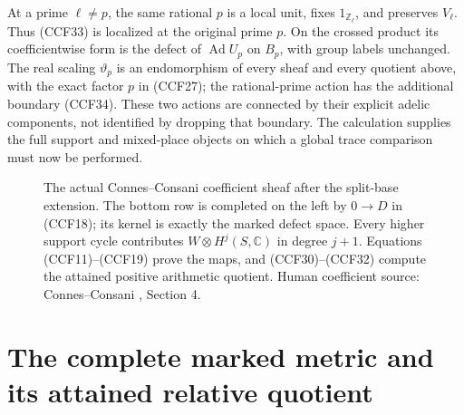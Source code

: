 \documentclass[11pt,a4paper]{article}
\theoremstyle{definition}\newtheorem{definition}[theorem]{Definition}
\begin{document}
At a prime $\ell\ne p$, the same rational $p$ is a local
unit, fixes $1_{\mathbb Z_\ell}$, and preserves $V_\ell$.
Thus (CCF33) is localized at the original prime $p$. On the
crossed product its coefficientwise form is the defect of
$\operatorname{Ad}U_p$ on $B_p$, with group labels unchanged.
The real scaling $\vartheta_p$ is an endomorphism of every
sheaf and every quotient above, with the exact factor $p$
in (CCF27); the rational-prime action has the additional
boundary (CCF34). These two actions are connected by their
explicit adelic components, not identified by dropping that
boundary. The calculation supplies the full support and
mixed-place objects on which a global trace comparison must
now be performed.

\begin{figure}[ht]
\centering
{}
\caption{The actual Connes--Consani coefficient sheaf after the
split-base extension. The bottom row is completed on the left
by $0\to D$ in (CCF18); its kernel is exactly the marked defect
space. Every higher support cycle contributes
$W\otimes H^j(S,\mathbb C)$ in degree $j+1$. Equations
(CCF11)--(CCF19) prove the maps, and (CCF30)--(CCF32) compute
the attained positive arithmetic quotient. Human coefficient
source: Connes--Consani \cite{ConnesConsani2025}, Section 4.}
\end{figure}

\section{The complete marked metric and its attained relative quotient}
\end{document}
